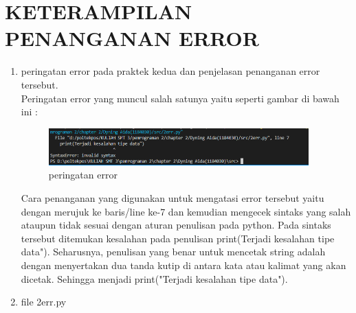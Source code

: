 \section{KETERAMPILAN PENANGANAN ERROR}
\begin{enumerate}
\item peringatan error pada praktek kedua dan penjelasan penanganan error tersebut.\\
Peringatan error yang muncul salah satunya yaitu seperti gambar di bawah ini :\\
				\begin{figure}[H]
				\includegraphics[width=10cm]{figures/1184030/penanganan.png}
				\centering
				\caption{peringatan error}
				\end{figure}
		Cara penanganan yang digunakan untuk mengatasi error tersebut yaitu dengan merujuk ke baris/line ke-7 dan kemudian mengecek sintaks yang salah ataupun tidak sesuai dengan aturan penulisan pada python. Pada sintaks tersebut ditemukan kesalahan pada penulisan print(Terjadi kesalahan tipe data"). Seharusnya, penulisan yang benar untuk mencetak string adalah dengan menyertakan dua tanda kutip di antara kata atau kalimat yang akan dicetak. Sehingga menjadi print("Terjadi kesalahan tipe data").
\item file 2err.py

\end{enumerate}